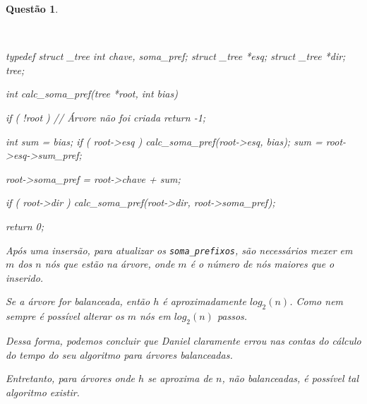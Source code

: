 \documentclass[12pt]{article}
\newenvironment{code}{\verbatim}{\endverbatim}
\newtheorem{ex}{Questão}
\newcounter{bleep}
\newenvironment{alfa}
{\begin{list}{(\alph{bleep})}{\usecounter{bleep}}}
{\end{list}}
\begin{document}
\begin{ex}
	\begin{alfa}
	\quad\\
	\item
	\begin{code}


    typedef struct _tree {
        int chave, soma_pref;
        struct _tree *esq;
        struct _tree *dir;
    } tree;
    
    int calc_soma_pref(tree *root, int bias) {
        if ( !root ) // Árvore não foi criada
            return -1;
        
        int sum = bias;
        if ( root->esq ) {
            calc_soma_pref(root->esq, bias);
            sum = root->esq->sum_pref;
        }
        
        root->soma_pref = root->chave + sum;
        
        if ( root->dir )
            calc_soma_pref(root->dir, root->soma_pref);

        return 0;
    }
	\end{code}
	\item
		Após uma insersão,
		para atualizar os \verb.soma_prefixos.,
		são necessários mexer em $m$ dos $n$ nós
		que estão na árvore,
		onde $m$ é o número de nós maiores que o inserido.

		Se a árvore for balanceada,
		então $h$ é aproximadamente $log_2(n)$.
		Como nem sempre é possível alterar os $m$ nós
		em $log_2(n)$ passos.
		
		Dessa forma, podemos concluir que
		Daniel claramente errou nas contas do cálculo do tempo
		do seu algoritmo para árvores balanceadas.

		Entretanto, para árvores onde $h$ se aproxima de $n$,
		não balanceadas, é possível tal algoritmo existir.

	\end{alfa}
\end{ex}
\newpage
\end{document}
